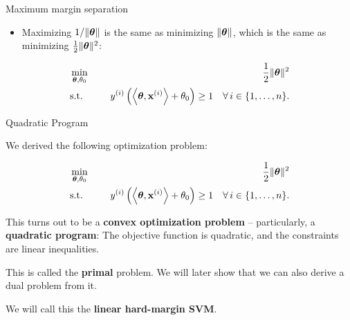 \documentclass[11pt,compress,t,notes=noshow, xcolor=table]{beamer}
\begin{document}
\begin{vbframe}{Maximum margin separation}
 \begin{itemize}
  \item Maximizing $1 / \|\bm{\theta}\|$ is the same as minimizing $\|\bm{\theta}\|$, which is the same as minimizing $\frac{1}{2}\|\bm{\theta}\|^2$:
  \end{itemize}

\begin{eqnarray*}
  & \min\limits_{\bm{\theta}, \theta_0} \quad & \frac{1}{2} \|\bm{\theta}\|^2 \\
   & \text{s.t.} & \,\,y^{(i)}  \left( \left\langle \bm{\theta}, \mathbf{x}^{(i)} \right\rangle + \theta_0 \right) \geq 1 \quad \forall\, i \in \{1, \ldots, n\}.
\end{eqnarray*}

\end{vbframe}

\begin{vbframe}{Quadratic Program}

We derived the following optimization problem:

  \begin{eqnarray*}
  & \min\limits_{\bm{\theta}, \theta_0} \quad & \frac{1}{2} \|\bm{\theta}\|^2 \\
  & \text{s.t.} & \,\,y^{(i)}  \left( \left\langle \bm{\theta}, \mathbf{x}^{(i)} \right\rangle + \theta_0 \right) \geq 1 \quad \forall\, i \in \{1, \ldots, n\}.
\end{eqnarray*}

This turns out to be a \textbf{convex optimization problem} -- particularly, a \textbf{quadratic program}: The objective function is quadratic, and the constraints are linear inequalities.

\lz

This is called the \textbf{primal} problem. We will later show that we can also derive a dual problem from it.

\lz

We will call this the \textbf{linear hard-margin SVM}.
\end{vbframe}
\end{document}
